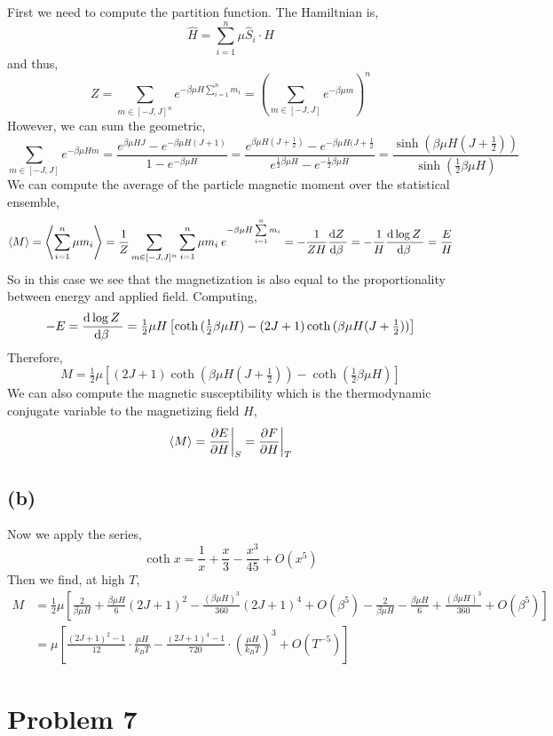 \documentclass[12pt]{extarticle}
\begin{document}
First we need to compute the partition function. The Hamiltnian is,
\[ \hat{H} = \sum_{i = 1}^n \mu \hat{S}_i \cdot H \]
and thus, 
\[ Z = \sum_{m \in [-J, J]^n} e^{-\beta \mu H \sum_{i = 1}^n m_i } = \left( \sum\limits_{m \in [-J, J]} e^{-\beta \mu m} \right)^n \]
However, we can sum the geometric,
\[ \sum_{m \in [-J, J]} e^{-\beta \mu H m} = \frac{e^{\beta \mu H J} - e^{- \beta  \mu H  (J+1)}}{1 - e^{-\beta \mu H}} = \frac{e^{\beta \mu H (J + \frac{1}{2})} - e^{- \beta \mu H (J + \frac{1}{2}}}{e^{\tfrac{1}{2} \beta \mu H} - e^{-\tfrac{1}{2} \beta \mu H }} = \frac{\sinh{(\beta \mu H (J + \frac{1}{2}))}}{\sinh{(\frac{1}{2} \beta \mu H )}} \]
We can compute the average of the particle magnetic moment over the statistical ensemble,
\[ \left< M \right> = \left< \sum_{i = 1}^n \mu m_i \right> = \frac{1}{Z} \sum_{m \in [-J, J]^n} \sum_{i = 1}^n \mu m_i \: e^{- \beta \mu H \sum\limits_{i = 1}^n m_i} = - \frac{1}{Z H} \frac{\mathrm{d}Z \:}{\mathrm{d}\beta \:} = - \frac{1}{H} \frac{\mathrm{d}\log{Z} \:}{\mathrm{d}\beta \:} = \frac{E}{H}  \]
So in this case we see that the magnetization is also equal to the proportionality between energy and applied field. Computing,
\[ -E = \frac{\mathrm{d}\log{Z} \:}{\mathrm{d}\beta \:} = \tfrac{1}{2} \mu H \left[ \coth{(\tfrac{1}{2} \beta \mu H)} -  (2J + 1) \coth{(\beta \mu H (J + \tfrac{1}{2}))} \right] \]
Therefore,
\[ M = \tfrac{1}{2} \mu \left[  (2J + 1) \coth{(\beta \mu H (J + \tfrac{1}{2}))} - \coth{(\tfrac{1}{2} \beta \mu H)} \right] \]
We can also compute the magnetic susceptibility which is the thermodynamic conjugate variable to the magnetizing field $H$,
\[ \left< M \right> = \frac{\partial{E}}{\partial{H}} \bigg|_{S} = \frac{\partial{F}}{\partial{H}} \bigg|_T \]  

\subsection{(b)}

Now we apply the series,
\[ \coth{x} = \frac{1}{x} + \frac{x}{3} - \frac{x^3}{45} + O(x^5) \]
Then we find, at high $T$,
\begin{align*}
M & = \tfrac{1}{2} \mu \left[ \frac{2}{\beta \mu H} + \frac{\beta \mu H}{6} (2 J + 1)^2 - \frac{(\beta \mu H)^3}{360} (2 J + 1)^4 + O(\beta^5) - \frac{2}{\beta \mu H} - \frac{\beta \mu H}{6} + \frac{(\beta \mu H)^3}{360} + O(\beta^5)  \right]
\\
& = \mu \left[ \frac{(2 J + 1)^2 - 1}{12} \cdot \frac{\mu H}{k_B T} - \frac{(2 J + 1)^4 - 1}{720} \cdot \left( \frac{\mu H}{k_B T} \right)^3 + O(T^{-5}) \right] 
\end{align*}

\section{Problem 7}
\end{document}
